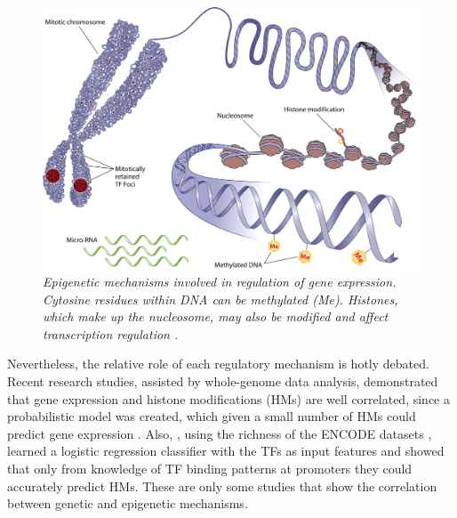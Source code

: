 \begin{figure}[!ht]
\begin{center}
 \includegraphics[scale = 0.27]{images/epigenetics}
\caption{\emph{Epigenetic mechanisms involved in regulation of gene expression. Cytosine residues within DNA can be methylated (Me). Histones, which make up the nucleosome, may also be modified and affect transcription regulation \citep{Horsager2014}.}}
\label{epigenetics-pic}
\end{center}
\end{figure}


Nevertheless, the relative role of each regulatory mechanism is hotly debated. Recent research studies, assisted by whole-genome data analysis, demonstrated that gene expression and histone modifications (HMs) are well correlated, since a probabilistic model was created, which given a small number of HMs could predict gene expression \citep{Karlic2010}. Also, \citet{Benveniste2014}, using the richness of the ENCODE datasets \citep{Dunham2012}, learned a logistic regression classifier with the TFs as input features and showed that only from knowledge of TF binding patterns at promoters they could accurately predict HMs. These are only some studies that show the correlation between genetic and epigenetic mechanisms. 
